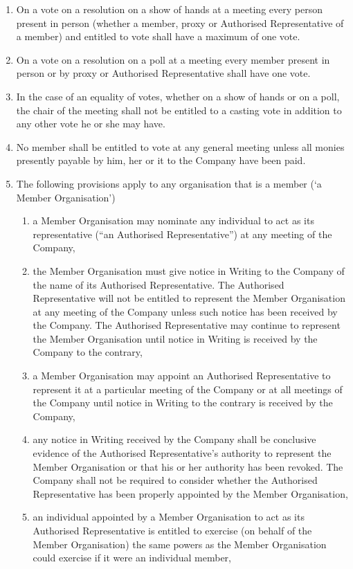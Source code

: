 \documentclass[a4paper,12pt]{article}
\begin{document}
\begin{enumerate}
  \item On a vote on a resolution on a show of hands at a meeting every person present in person (whether a member, proxy or Authorised Representative of a member) and entitled to vote shall have a maximum of one vote.
  \item On a vote on a resolution on a poll at a meeting every member present in person or by proxy or Authorised Representative shall have one vote.
  \item In the case of an equality of votes, whether on a show of hands or on a poll, the chair of the meeting shall not be entitled to a casting vote in addition to any other vote he or she may have.
  \item No member shall be entitled to vote at any general meeting unless all monies presently payable by him, her or it to the Company have been paid.
  \item The following provisions apply to any organisation that is a member (`a Member Organisation')
  \begin{enumerate}
    \item a Member Organisation may nominate any individual to act as its representative (“an Authorised Representative”) at any meeting of the Company,
    \item the Member Organisation must give notice in Writing to the Company of the name of its Authorised Representative. The Authorised Representative will not be entitled to represent the Member Organisation at any meeting of the Company unless such notice has been received by the Company. The Authorised Representative may continue to represent the Member Organisation until notice in Writing is received by the Company to the contrary,
    \item a Member Organisation may appoint an Authorised Representative to represent it at a particular meeting of the Company or at all meetings of the Company until notice in Writing to the contrary is received by the Company,
    \item any notice in Writing received by the Company shall be conclusive evidence of the Authorised Representative’s authority to represent the Member Organisation or that his or her authority has been revoked.  The Company shall not be required to consider whether the Authorised Representative has been properly appointed by the Member Organisation,
    \item an individual appointed by a Member Organisation to act as its Authorised Representative is entitled to exercise (on behalf of the Member Organisation) the same powers as the Member Organisation could exercise if it were an individual member,

\end{enumerate}
\end{enumerate}
\end{document}
